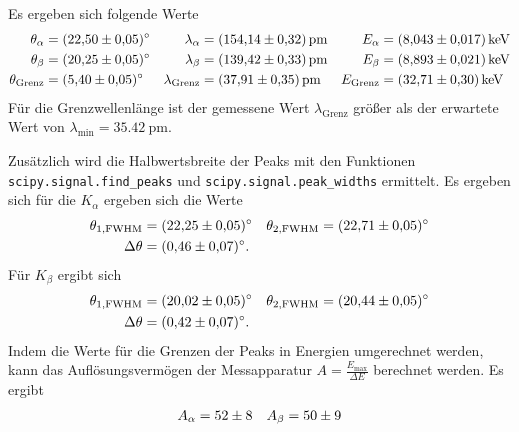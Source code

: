 Es ergeben sich folgende Werte 
\begin{align*}
    \theta_\alpha        &= \qty{22.50 \pm 0.05}{\degree} & \lambda_\alpha      &= \qty{154.14 \pm 0.32}{\pico\meter}  & E_\alpha       &= \qty{8.043 \pm 0.017}{\kilo\eV}  \\
    \theta_\beta         &= \qty{20.25 \pm 0.05}{\degree} & \lambda_\beta       &= \qty{139.42 \pm 0.33}{\pico\meter}  & E_\beta        &= \qty{8.893 \pm 0.021}{\kilo\eV}  \\
    \theta_\text{Grenz}  &= \qty{5.4 \pm 0.05}{\degree} & \lambda_\text{Grenz}  &= \qty{37.91 \pm 0.35}{\pico\meter}  & E_\text{Grenz}  &= \qty{32.71 \pm 0.30}{\kilo\eV}   
\end{align*}
Für die Grenzwellenlänge ist der gemessene Wert $\lambda_\text{Grenz}$ größer als der erwartete Wert von $\lambda_\text{min}= \qty{35.42}{\pico\m}$.

Zusätzlich wird die Halbwertsbreite der Peaks mit den Funktionen \texttt{scipy.signal.find\_peaks}  und \texttt{scipy.signal.peak\_widths} \cite{scipy} ermittelt.
Es ergeben sich für die $K_\alpha$ ergeben sich die Werte
\begin{align*}
    \theta_{1,\text{FWHM}} &= \qty{22.25 \pm 0.05}{\degree} & \theta_{2,\text{FWHM}} = \qty{22.71 \pm 0.05}{\degree} \\
    \Delta \theta &= \qty{0.46 \pm 0.07}{\degree}.
\end{align*}
Für $K_\beta$ ergibt sich
\begin{align*}
    \theta_{1,\text{FWHM}} &= \qty{20.02 \pm 0.05}{\degree} & \theta_{2,\text{FWHM}} = \qty{20.44 \pm 0.05}{\degree} \\
    \Delta \theta &= \qty{0.42 \pm 0.07}{\degree}.
\end{align*}
Indem die Werte für die Grenzen der Peaks in Energien umgerechnet werden, 
kann das Auflösungsvermögen der Messapparatur $A= \frac{E_\text{max}}{\Delta E}$ berechnet werden.
Es ergibt
\begin{align*}
    A_\alpha &= \num{52 \pm 8} & A_\beta = \num{50 \pm 9}
\end{align*}

